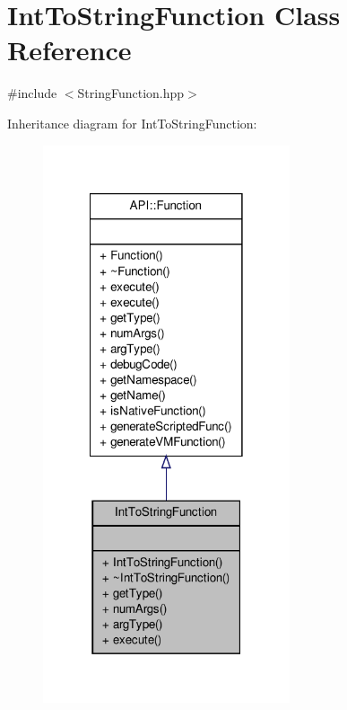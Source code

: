 \hypertarget{class_int_to_string_function}{\section{Int\-To\-String\-Function Class Reference}
\label{class_int_to_string_function}
}


{\ttfamily \#include $<$String\-Function.\-hpp$>$}



Inheritance diagram for Int\-To\-String\-Function\-:
\nopagebreak
\begin{figure}[H]
\begin{center}
\leavevmode
\includegraphics[width=206pt]{class_int_to_string_function__inherit__graph}
\end{center}
\end{figure}


